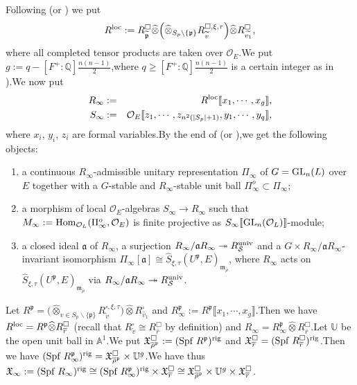 \documentclass[SecEq,CM,GP]{degruyter-crelle} %
\theoremstyle{plain}
\newcommand{\defvarring}{{R_{\overline{r}}^\Box}}
\newcommand{\GLN}{{\rm GL}}
\newcommand{\homo}{{\rm Hom}}
\newcommand{\loc}{{\rm loc}}
\newcommand{\rig}{{\rm rig}}
\newcommand{\ra}{{\longrightarrow}}
\newcommand{\Spf}{{\mathrm{Spf}}}
\newcommand{\univ}{{\rm univ}}
\newcommand{\BA}{{\mathbb{A}}}
\newcommand{\BQ}{{\mathbb{Q}}}
\newcommand{\BU}{{\mathbb{U}}}
\newcommand{\co}{\mathcal O}
\newcommand{\cS}{\mathcal S}
\newcommand{\cO}{\mathcal O}
\newcommand{\FX}{{\mathfrak{X}}}
\newcommand{\fa}{{\mathfrak{a}}}
\newcommand{\fm}{{\mathfrak{m}}}
\newcommand{\fp}{{\mathfrak{p}}}
\begin{document}
Following \cite[Section 4.1.1]{2019DINGSimple} (or \cite[Section 2.8]{PATCHING2016}) we put
\begin{eqnarray*}
R^{\loc}:=R_{\widetilde{\fp}}^{\square} \widehat{\otimes} \Big(\widehat{\otimes}_{S_p\backslash\{\fp\}}R_{\widetilde{v}}^{\square, \xi,\tau}\Big)\widehat{\otimes} R_{\widetilde{v_1}}^{\square} ,
\end{eqnarray*}
where all completed tensor products are taken over $\cO_E$.\;We put $g:=q-[F^+:\BQ]\frac{n(n-1)}{2}$,\;where $q\geq [F^+:\BQ]\frac{n(n-1)}{2}$ is a certain integer as in  \cite[Section 2.6,\;Page 217]{PATCHING2016}).\;We now put 
\begin{eqnarray*}
R_{\infty}&:=&R^{\loc}\llbracket x_1,\cdots, x_g\rrbracket,\\
S_{\infty}&:=&\co_E\llbracket z_1,\cdots, z_{n^2(|S_p|+1)}, y_1,\cdots, y_q\rrbracket,
\end{eqnarray*}
where $x_i$, $y_i$, $z_i$ are formal variables.\;By the end of \cite[Section 4.1.1]{2019DINGSimple} (or \cite[Section 2.8]{PATCHING2016}),\;we get the following objects:
\begin{enumerate}
\item a continuous $R_{\infty}$-admissible unitary representation $\Pi_{\infty}$ of $G=\GLN_n(L)$ over $E$ together with a $G$-stable and $R_{\infty}$-stable unit ball $\Pi_{\infty}^o\subset \Pi_{\infty}$;
\item a morphism of local $\co_E$-algebras $S_{\infty}\ra R_{\infty}$ such that $M_{\infty}:= \homo_{\co_L}(\Pi_{\infty}^o, \co_E)$ is finite projective as $S_{\infty}\llbracket \GLN_n(\co_L)\rrbracket$-module;
\item a closed ideal $\fa$ of $R_{\infty}$, a surjection $R_{\infty}/\fa R_{\infty}\twoheadrightarrow R_{\cS}^{\univ}$ and a  $G   \times R_{\infty}/\fa R_{\infty}$-invariant isomorphism $\Pi_{\infty}[\fa]\cong \widehat{S}_{\xi,\tau}(U^{\fp},E)_{\fm_{\overline{\rho}}}$, where $R_{\infty}$ acts on $\widehat{S}_{\xi,\tau}(U^{\fp},E)_{\fm_{\overline{\rho}}}$ via $R_{\infty}/\fa R_{\infty}\twoheadrightarrow  R_{\cS}^{\univ}$.
\end{enumerate}

Let $R^{\fp}=\Big(\widehat{\otimes}_{v\in S_p\backslash\{\fp\}}R_{\widetilde{v}}^{\square, \xi,\tau}\Big)\widehat{\otimes} R_{\widetilde{v_1}}^{\square}$ and $R_{\infty}^{\fp}:=R^{\fp}\llbracket x_1,\cdots, x_g\rrbracket$.\;Then we have  $R^{\loc}=R^{\fp}\widehat{\otimes} \defvarring$ (recall that $R_{\widetilde{v}}^{\square}\cong \defvarring$ by definition) and $R_{\infty}=R_{\infty}^{\fp}\widehat{\otimes} \defvarring$.\;Let $\BU$ be the open unit ball in $\BA^1$.\;We put $\FX_{\overline{\rho}^{\fp}}^\Box:=(\Spf\;R^{\fp})^{\rig}$ and  $\mathfrak{X}_{\overline{r}}^\Box=(\Spf\;R_{\overline{r}}^\Box)^{\rig}$.\;Then we have $(\Spf\;R^{\fp}_{\infty})^{\rig}=\FX_{\overline{\rho}^{\fp}}^\Box\times \BU^g$.\;We have thus
$\FX_{\infty}:=(\Spf\;R_{\infty})^{\rig}\cong (\Spf\;R^{\fp}_{\infty})^{\rig}\times \mathfrak{X}_{\overline{r}}^\Box\cong \FX_{\overline{\rho}^{\fp}}^\Box\times \BU^g\times \mathfrak{X}_{\overline{r}}^\Box$.\;
\end{document}
